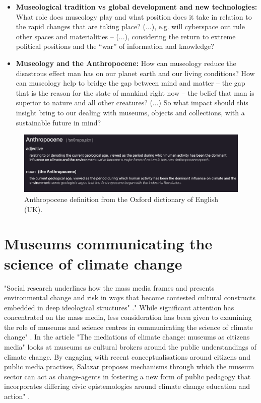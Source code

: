 \begin{itemize}
    \item \textbf{Museological tradition vs global development and new technologies:} What role does museology play and what position does it take in relation to the rapid changes that are taking place? (...), e.g. will cyberspace out rule other spaces and materialities – (...), considering the return to extreme political positions and the “war” of information and knowledge?
    \item \textbf{Museology and the Anthropocene:} How can museology reduce the disastrous effect man has on our planet earth and our living conditions? How can museology help to bridge the gap between mind and matter – the gap that is the reason for the state of mankind right now – the belief that man is superior to nature and all other creatures? (...) So what impact should this insight bring to our dealing with museums, objects and collections, with a sustainable future in mind?
\end{itemize}

\begin{figure}[H]
\includegraphics[width=12.5cm]{pictures/background/anthropocene.png}
\caption{Anthropocene definition from the Oxford dictionary of English (UK).}
\centering
\end{figure}

\section{Museums communicating the science of climate change}

"Social research underlines how the mass media frames and presents environmental change and risk in ways that become contested cultural constructs embedded in deep ideological structures" \autocite[p. 1]{salazar_mediations_2011}." While significant attention has concentrated on the mass media, less consideration has been given to examining the role of museums and science centres in communicating the science of climate change" \autocite[p. 1]{salazar_mediations_2011}. In the article "The mediations of climate change: museums as citizens media" \autocite{salazar_mediations_2011} looks at museums as cultural brokers around the public understandings of climate change. By engaging with recent conceptualisations around citizens and public media practises, Salazar proposes mechanisms through which the museum sector can act as change-agents in fostering a new form of public pedagogy that incorporates differing civic epistemologies around climate change education and action" \autocite[p. 1]{salazar_mediations_2011}.

